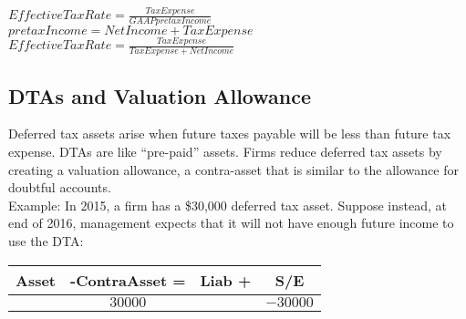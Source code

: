 $EffectiveTaxRate = \frac{TaxExpense}{GAAPpretaxIncome}$  \\
$ pretaxIncome = NetIncome + TaxExpense $ \\
$EffectiveTaxRate = \frac{TaxExpense}{TaxExpense+NetIncome}$  

\subsection*{DTAs and Valuation Allowance}

Deferred tax assets arise when future taxes payable will be less than future tax expense. DTAs are like “pre-paid” assets.
Firms reduce deferred tax assets by creating a valuation allowance, a contra-asset that is
similar to the allowance for doubtful accounts.\\


Example: In 2015, a firm has a \$30,000 deferred tax asset.
Suppose instead, at end of 2016, management expects that it will not have enough future income
to use the DTA:
\begin{tabular}{ |c|c||c|c| } 
	\hline
	Asset &-ContraAsset = & Liab +  & S/E	 \\ 
	\hline
	& $30000$ &  & $-30000$	 \\ 	
	\hline
\end{tabular} 